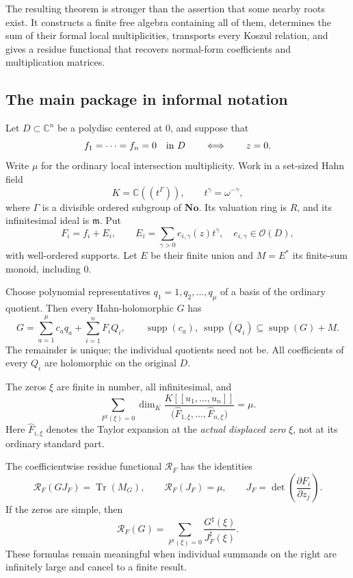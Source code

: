 \documentclass[11pt,letterpaper]{article}
\theoremstyle{definition}
\theoremstyle{remark}
\newcommand{\No}{\mathbf{No}}
\newcommand{\C}{\mathbb C}
\newcommand{\OO}{\mathcal O}
\newcommand{\mm}{\mathfrak m}
\newcommand{\RF}{\mathcal R_F}
\newcommand{\supp}{\operatorname{supp}}
\newcommand{\Tr}{\operatorname{Tr}}
\newcommand{\sh}{^{\sharp}}
\numberwithin{equation}{section}
\begin{document}
The resulting theorem is stronger than the assertion that some nearby roots exist. It constructs a finite free algebra containing all of them, determines the sum of their formal local multiplicities, transports every Koszul relation, and gives a residue functional that recovers normal-form coefficients and multiplication matrices.

\subsection{The main package in informal notation}
Let $D\subset\C^n$ be a polydisc centered at $0$, and suppose that
\[
 f_1=\cdots=f_n=0\quad\hbox{in }D
 \qquad\Longleftrightarrow\qquad z=0.
\]
Write $\mu$ for the ordinary local intersection multiplicity. Work in a set-sized Hahn field
\[
 K=\C((t^\Gamma)),\qquad t^\gamma=\omega^{-\gamma},
\]
where $\Gamma$ is a divisible ordered subgroup of $\No$. Its valuation ring is $R$, and its infinitesimal ideal is $\mm$. Put
\[
 F_i=f_i+E_i,\qquad E_i=\sum_{\gamma>0} e_{i,\gamma}(z)t^\gamma,
 \quad e_{i,\gamma}\in\OO(D),
\]
with well-ordered supports. Let $E$ be their finite union and $M=E^*$ its finite-sum monoid, including $0$.

Choose polynomial representatives $q_1=1,q_2,\ldots,q_\mu$ of a basis of the ordinary quotient. Then every Hahn-holomorphic $G$ has
\begin{equation}\label{eq:main-division-intro}
 G=\sum_{a=1}^{\mu}c_aq_a+\sum_{i=1}^n F_iQ_i,
 \qquad
 \supp(c_a),\ \supp(Q_i)\subseteq\supp(G)+M.
\end{equation}
The remainder is unique; the individual quotients need not be. All coefficients of every $Q_i$ are holomorphic on the original $D$.

The zeros $\xi$ are finite in number, all infinitesimal, and
\begin{equation}\label{eq:main-count-intro}
 \sum_{F\sh(\xi)=0}
 \dim_K\frac{K[[u_1,\ldots,u_n]]}
 {\bigl(\widehat F_{1,\xi},\ldots,\widehat F_{n,\xi}\bigr)}
 =\mu.
\end{equation}
Here $\widehat F_{i,\xi}$ denotes the Taylor expansion at the \emph{actual displaced zero} $\xi$, not at its ordinary standard part.

The coefficientwise residue functional $\RF$ has the identities
\begin{equation}\label{eq:main-residue-intro}
 \RF(GJ_F)=\Tr(M_G),\qquad
 \RF(J_F)=\mu,
 \qquad
 J_F=\det\left(\frac{\partial F_i}{\partial z_j}\right).
\end{equation}
If the zeros are simple, then
\begin{equation}\label{eq:main-simple-intro}
 \RF(G)=\sum_{F\sh(\xi)=0}\frac{G\sh(\xi)}{J_F\sh(\xi)}.
\end{equation}
These formulas remain meaningful when individual summands on the right are infinitely large and cancel to a finite result.
\end{document}
